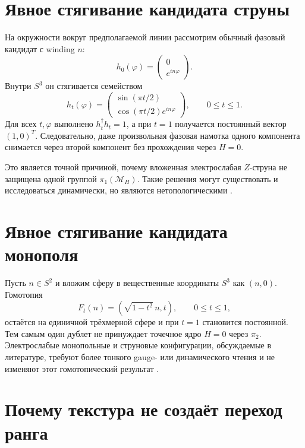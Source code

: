 \section{Явное стягивание кандидата струны}

На окружности вокруг предполагаемой линии рассмотрим обычный фазовый
кандидат с winding $n$:
\begin{equation}
 h_0(\varphi)=
 \begin{pmatrix}0\\ e^{in\varphi}\end{pmatrix}.
\end{equation}
Внутри $S^3$ он стягивается семейством
\begin{equation}
 h_t(\varphi)=
 \begin{pmatrix}
 \sin(\pi t/2)\\
 \cos(\pi t/2)e^{in\varphi}
 \end{pmatrix},
 \qquad 0\leq t\leq1.
 \label{eq:v6-higgs-loop-contraction}
\end{equation}
Для всех $t,\varphi$ выполнено $h_t^\dagger h_t=1$, а при $t=1$
получается постоянный вектор $(1,0)^T$. Следовательно, даже произвольная
фазовая намотка одного компонента снимается через второй компонент без
прохождения через $H=0$.

Это является точной причиной, почему вложенная электрослабая $Z$-струна
не защищена одной группой $\pi_1(\mathcal M_H)$. Такие решения могут
существовать и исследоваться динамически, но являются нетопологическими
\cite{higgs-topology-achucarro-vachaspati2000}.

\section{Явное стягивание кандидата монополя}

Пусть $n\in S^2$ и вложим сферу в вещественные координаты $S^3$ как
$(n,0)$. Гомотопия
\begin{equation}
 F_t(n)=\left(\sqrt{1-t^2}\,n,t\right),
 \qquad0\leq t\leq1,
 \label{eq:v6-higgs-sphere-contraction}
\end{equation}
остаётся на единичной трёхмерной сфере и при $t=1$ становится постоянной.
Тем самым один дублет не принуждает точечное ядро $H=0$ через
$\pi_2$. Электрослабые монопольные и струновые конфигурации, обсуждаемые
в литературе, требуют более тонкого gauge- или динамического чтения и не
изменяют этот гомотопический результат
\cite{higgs-topology-patel-vachaspati2022}.

\section{Почему текстура не создаёт переход ранга}

